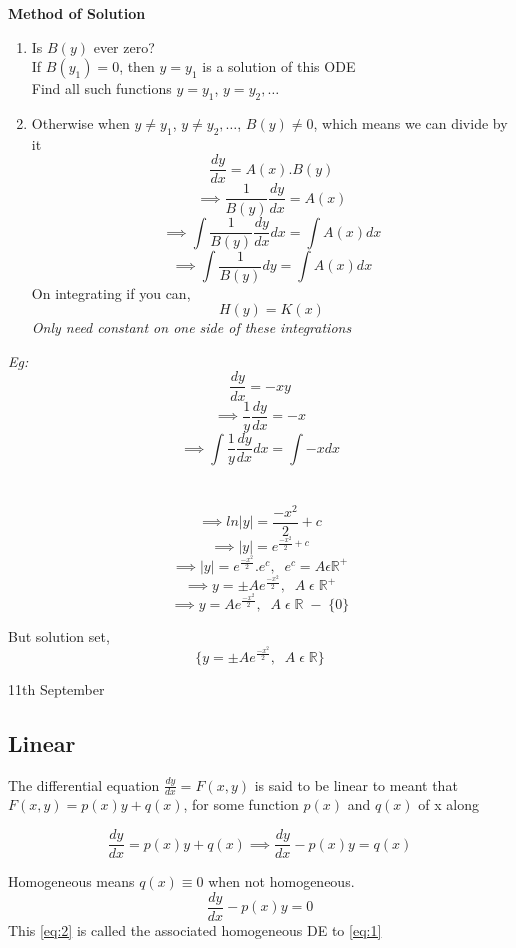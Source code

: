 \documentclass[11pt]{article}
\theoremstyle{definition}
\newcommand{\R}{\mathbb{R}}
\begin{document}
\textbf{Method of Solution}
\begin{enumerate}
    \item Is $B(y)$ ever zero? \\
    If $B(y_1) = 0$, then $y = y_1$ is a solution of this ODE\\
    Find all such functions $y = y_1$, $y = y_2, \dots$
    \item Otherwise when $y \neq y_1$, $y \neq y_2, \dots$, $B(y) \neq 0$, which means we can divide by it
    $$\frac{dy}{dx} = A(x).B(y)$$ 
    $$\implies \frac{1}{B(y)}\frac{dy}{dx} = A(x)$$
    $$\implies \int \frac{1}{B(y)}\frac{dy}{dx} dx = \int A(x) dx$$
    $$\implies \int \frac{1}{B(y)}dy = \int A(x) dx$$ 
    On integrating if you can,
    $$H(y) = K(x)$$
    \textit{Only need constant on one side of these integrations}
    
\end{enumerate}
\textit{Eg:} $$\frac{dy}{dx} = -xy$$
    $$\implies \frac{1}{y}\frac{dy}{dx} = -x$$
    $$\implies \int \frac{1}{y}\frac{dy}{dx} dx = \int -x dx$$\\\\
    $$\implies ln|y| = \frac{-x^2}{2} + c$$
    $$\implies |y| = e^{\frac{-x^2}{2} + c}$$
    $$\implies |y| = e^{\frac{-x^2}{2}}.e^c,\;\; e^c = A \epsilon \R^+$$
    $$\implies y = \pm Ae^{\frac{-x^2}{2}},\;\; A\; \epsilon\; \R^+$$ 
    $$\implies y = Ae^{\frac{-x^2}{2}},\;\; A\; \epsilon\; \R\; -\; \{0\}$$
    
    But solution set,
    $$\{y = \pm Ae^{\frac{-x^2}{2}},\;\; A\; \epsilon\; \R\}$$


\newpage

\begin{center}
{\LARGE 11th September}\\
\end{center}

\subsection{Linear}
The differential equation $\frac{dy}{dx} = F(x,y)$ is said to be linear to meant that $F(x,y) = p(x)y + q(x)$, for some function $p(x)$ and $q(x)$ of x along

\begin{equation} \label{eq:1}
\frac{dy}{dx} = p(x)y + q(x) \implies \frac{dy}{dx} - p(x)y = q(x)
\end{equation}
 
Homogeneous means $q(x) \equiv 0$ when not homogeneous. 
\begin{equation} \label{eq:2}
\frac{dy}{dx} - p(x)y = 0
\end{equation}
This \ref{eq:2} is called the associated homogeneous DE to \ref{eq:1}
\end{document}
